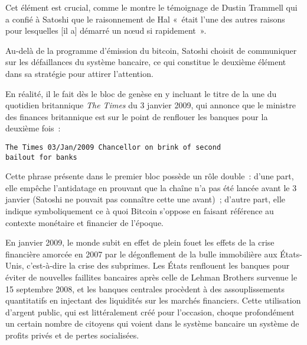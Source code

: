 Cet élément est crucial, comme le montre le témoignage de Dustin Trammell qui a confié à Satoshi que le raisonnement de Hal «~était l'une des autres raisons pour lesquelles [il a] démarré un nœud si rapidement~».



Au-delà de la programme d'émission du bitcoin, Satoshi choisit de communiquer sur les défaillances du système bancaire, ce qui constitue le deuxième élément dans sa stratégie pour attirer l'attention.

En réalité, il le fait dès le bloc de genèse en y incluant le titre de la une du quotidien britannique \emph{The Times} du 3 janvier 2009, qui annonce que le ministre des finances britannique est sur le point de renflouer les banques pour la deuxième fois~:

\begin{verbatim}
The Times 03/Jan/2009 Chancellor on brink of second
bailout for banks
\end{verbatim}

Cette phrase présente dans le premier bloc possède un rôle double~: d'une part, elle empêche l'antidatage en prouvant que la chaîne n'a pas été lancée avant le 3 janvier (Satoshi ne pouvait pas connaître cette une avant)~; d'autre part, elle indique symboliquement ce à quoi Bitcoin s'oppose en faisant référence au contexte monétaire et financier de l'époque.

En janvier 2009, le monde subit en effet de plein fouet les effets de la crise financière amorcée en 2007 par le dégonflement de la bulle immobilière aux États-Unis, c'est-à-dire la crise des subprimes. Les États renflouent les banques pour éviter de nouvelles faillites bancaires après celle de Lehman Brothers survenue le 15 septembre 2008, et les banques centrales procèdent à des assouplissements quantitatifs en injectant des liquidités sur les marchés financiers. Cette utilisation d'argent public, qui est littéralement créé pour l'occasion, choque profondément un certain nombre de citoyens qui voient dans le système bancaire un système de profits privés et de pertes socialisées.

